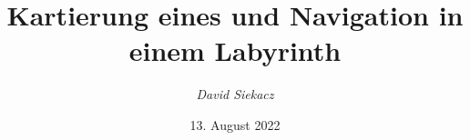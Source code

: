 \usepackage{enumitem}
\usepackage{polyglossia}
\setmainlanguage[babelshorthands=true]{german}


\usepackage{blindtext}
\usepackage{float}
\usepackage{listings}

\usepackage{amsmath}
\usepackage{mathtools}

\usepackage{graphicx}
\usepackage{booktabs}
\usepackage{multicol}
\usepackage{amsfonts} 

\usepackage{amssymb}    %
\usepackage{booktabs}   %
\usepackage[hang,font={sf,footnotesize},labelfont={footnotesize,bf}]{caption}

\usepackage[%
left=2.5cm,
right=2.5cm,
top=2.5cm,
bottom=2cm,
]{geometry}





\usepackage[
detect-all,
locale=DE,
binary-units=true,
range-phrase={\,\dots\,},
]{siunitx}                %

\usepackage{hyperref}  %
\usepackage{color}

\hypersetup{
	colorlinks=true,      %
	linktoc=all,          %
	linkcolor=linkblack,  %
	citecolor=linkblack,  %
	filecolor=linkblack,  %
	urlcolor=linkblack,   %
	pdfstartpage=1
}

\newcommand{\zb}[0]{z.\,B.\ }
\newcommand{\dahe}[0]{d.\,h.\ }
\newcommand{\ua}[0]{u.\,a.\ }

\title{Kartierung eines und Navigation in einem Labyrinth}
\author{\textit{David Siekacz}}
\date{13. August 2022}

